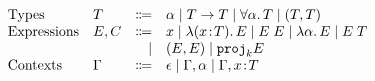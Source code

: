\[
\begin{array}{llrl}
  \text{Types}       & T    & \Coloneqq & \alpha \mid T \to T \mid \forall \alpha. \, T \mid (T, T) \\ 
  \text{Expressions} & E, C & \Coloneqq & x \mid \lambda (x \!:\! T).\, E \mid E \; E \mid \lambda \alpha.\, E \mid E \; T \\ 
                     &      & \mid      & (E, E) \mid {\texttt{proj}}_{k} E \\
  \text{Contexts} & \Gamma & \Coloneqq & \epsilon \mid \Gamma, \alpha \mid \Gamma, x \!:\! T \\
\end{array}
\]
